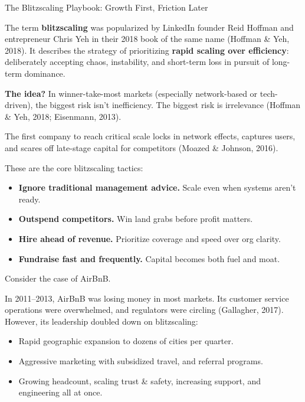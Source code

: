 \begin{HistoricalSidebar}{The Blitzscaling Playbook: Growth First, Friction Later}

    The term \textbf{blitzscaling} was popularized by LinkedIn founder Reid Hoffman and entrepreneur Chris Yeh in their 
    2018 book of the same name (Hoffman \& Yeh, 2018).  
    It describes the strategy of prioritizing \textbf{rapid scaling over efficiency}: deliberately accepting chaos, instability, 
    and short-term loss in pursuit of long-term dominance.
    
    \medskip
    
    \textbf{The idea?} In winner-take-most markets (especially network-based or tech-driven), the biggest risk isn’t 
    inefficiency. The biggest risk is irrelevance (Hoffman \& Yeh, 2018; Eisenmann, 2013).  
  
    \medskip
  
    The first company to reach critical scale locks in network effects, captures users, and scares off late-stage capital 
    for competitors (Moazed \& Johnson, 2016).
    
    \medskip
    
    These are the core blitzscaling tactics:
  
    \medskip
    
    \begin{itemize}
      \item \textbf{Ignore traditional management advice.} Scale even when systems aren’t ready.
      \item \textbf{Outspend competitors.} Win land grabs before profit matters.
      \item \textbf{Hire ahead of revenue.} Prioritize coverage and speed over org clarity.
      \item \textbf{Fundraise fast and frequently.} Capital becomes both fuel and moat.
    \end{itemize}
    
    \medskip
    
    Consider the case of AirBnB.
  
    \medskip
    
    In 2011–2013, AirBnB was losing money in most markets. Its customer service operations were 
    overwhelmed, and regulators were circling (Gallagher, 2017). However, its leadership doubled down on blitzscaling:
    
    \begin{itemize}
      \item Rapid geographic expansion to dozens of cities per quarter.
      \item Aggressive marketing with subsidized travel, and referral programs.
      \item Growing headcount, scaling trust \& safety, increasing support, and engineering all at once.
    \end{itemize}
    

\end{HistoricalSidebar}
